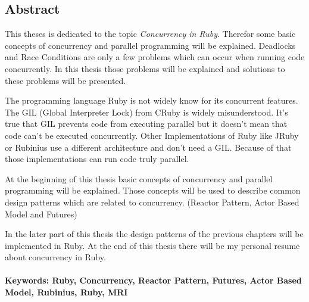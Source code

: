 \subsection*{Abstract}

This theses is dedicated to the topic \emph{Concurrency in Ruby}. Therefor some basic concepts of concurrency and parallel programming will be explained. Deadlocks and Race Conditions are only a few problems which can occur when running code concurrently. In this thesis those problems will be explained and solutions to these problems will be presented. 

The programming language Ruby is not widely know for its concurrent features. The GIL (Global Interpreter Lock) from CRuby is widely misunderstood. It's true that GIL prevents code from executing parallel but it doesn't mean that code can't be executed concurrently. Other Implementations of Ruby like JRuby or Rubinius use a different architecture and don't need a GIL. Because of that those implementations can run code truly parallel.

At the beginning of this thesis basic concepts of concurrency and parallel programming will be explained. Those concepts will be used to describe common design patterns which are related to concurrency. (Reactor Pattern, Actor Based Model and Futures)

In the later part of this thesis the design patterns of the previous chapters will be implemented in Ruby. At the end of this thesis there will be my personal resume about concurrency in Ruby.

\paragraph{Keywords:  Ruby, Concurrency, Reactor Pattern, Futures, Actor Based Model, Rubinius, Ruby, MRI}

